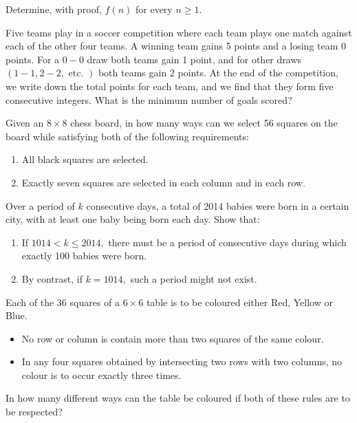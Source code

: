 \documentclass{pset}
\begin{document}
\begin{problems}
\begin{problem}[IrMO 2017 Q4]
    Determine, with proof, $f(n)$ for every $n \geq 1$.
\end{problem}

\begin{problem}[IrMO 2017 Q7]
    Five teams play in a soccer competition where each team plays one match against each of the other four teams. A winning team gains 5 points and a losing team 0 points. For a \(0-0\) draw both teams gain 1 point, and for other draws \((1-1,2-2, \text { etc. })\) both teams gain 2 points. At the end of the competition, we write down the total points for each team, and we find that they form five consecutive integers. What is the minimum number of goals scored?
\end{problem}

\begin{problem}[IrMO 2014 Q1]
    Given an \(8 \times 8\) chess board, in how many ways can we select 56 squares on the board while satisfying both of the following requirements:
    \begin{enumerate}
        \item All black squares are selected.
        \item Exactly seven squares are selected in each column and in each row.
    
    \end{enumerate}
\end{problem}

\begin{problem}[IrMO 2014 Q10]
    Over a period of \(k\) consecutive days, a total of 2014 babies were born in a certain city, with at least one baby being born each day. Show that:
    \begin{enumerate}
        \item If \(1014<k \leq 2014,\) there must be a period of consecutive days during which exactly 100 babies were born.
        \item By contrast, if \(k=1014,\) such a period might not exist.    
    \end{enumerate}
\end{problem}

\begin{problem}[IrMO 2013 Q4]
    Each of the 36 squares of a \(6 \times 6\) table is to be coloured either Red, Yellow or Blue.
    \begin{itemize}
        \item No row or column is contain more than two squares of the same colour.
    \item In any four squares obtained by intersecting two rows with two columns, no colour is to occur exactly three times.
    \end{itemize}
    In how many different ways can the table be coloured if both of these rules are to
    be respected?
\end{problem}


\end{problems}
\end{document}
